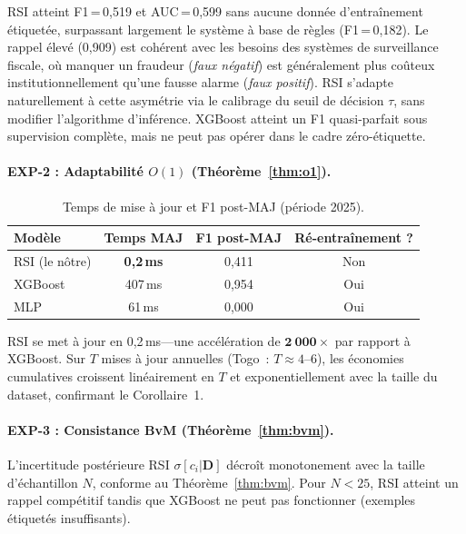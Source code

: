 \documentclass[letterpaper]{article}
\begin{document}
RSI atteint F1\,=\,0,519 et AUC\,=\,0,599 sans aucune donn\'ee
d'entra\^inement \'etiquet\'ee, surpassant largement le syst\`eme
\`a base de r\`egles (F1\,=\,0,182). Le rappel \'elev\'e (0,909) est coh\'erent avec les besoins des
syst\`emes de surveillance fiscale, o\`u manquer un fraudeur
(\emph{faux n\'egatif}) est g\'en\'eralement plus co\^uteux
institutionnellement qu'une fausse alarme (\emph{faux positif}).
RSI s'adapte naturellement \`a cette asym\'etrie via le calibrage
du seuil de d\'ecision $\tau$, sans modifier l'algorithme d'inf\'erence.
XGBoost atteint un F1 quasi-parfait sous supervision compl\`ete, mais
ne peut pas op\'erer dans le cadre z\'ero-\'etiquette.

\paragraph{EXP-2 : Adaptabilit\'e $O(1)$ (Th\'eor\`eme~\ref{thm:o1}).}

\begin{table}[H]
\centering
\caption{Temps de mise \`a jour et F1 post-MAJ (p\'eriode 2025).}
\label{tab:update}
\renewcommand{\arraystretch}{1.2}
\begin{tabular}{lccc}
\toprule
\textbf{Mod\`ele} & \textbf{Temps MAJ} & \textbf{F1 post-MAJ}
  & \textbf{R\'e-entra\^inement ?} \\
\midrule
RSI (le n\^otre) & \textbf{0,2\,ms} & 0,411 & Non \\
XGBoost & 407\,ms & 0,954 & Oui \\
MLP & 61\,ms & 0,000 & Oui \\
\bottomrule
\end{tabular}
\end{table}

RSI se met \`a jour en 0,2\,ms---une acc\'el\'eration de
$\mathbf{2~000\times}$ par rapport \`a XGBoost. Sur $T$ mises \`a jour
annuelles (Togo~: $T \approx 4$--$6$), les \'economies cumulatives
croissent lin\'eairement en $T$ et exponentiellement avec la taille
du dataset, confirmant le Corollaire~1.

\paragraph{EXP-3 : Consistance BvM (Th\'eor\`eme~\ref{thm:bvm}).}
L'incertitude post\'erieure RSI $\sigma[c_i | \mathbf{D}]$ d\'ecro\^it
monotonement avec la taille d'\'echantillon $N$, conforme au
Th\'eor\`eme~\ref{thm:bvm}. Pour $N < 25$, RSI atteint un rappel
comp\'etitif tandis que XGBoost ne peut pas fonctionner (exemples
\'etiquet\'es insuffisants).
\end{document}
